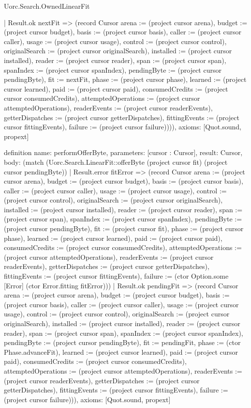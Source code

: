 \begin{lexlean}{Uorc.Search.OwnedLinearFit}
\begin{semanticmodule}
{    | Result.ok nextFit => (record Cursor {arena := (project cursor arena), budget := (project cursor budget), basis := (project cursor basis), caller := (project cursor caller), usage := (project cursor usage), control := (project cursor control), originalSearch := (project cursor originalSearch), installed := (project cursor installed), reader := (project cursor reader), span := (project cursor span), spanIndex := (project cursor spanIndex), pendingByte := (project cursor pendingByte), fit := nextFit, phase := (project cursor phase), learned := (project cursor learned), paid := (project cursor paid), consumedCredits := (project cursor consumedCredits), attemptedOperations := (project cursor attemptedOperations), readerEvents := (project cursor readerEvents), getterDispatches := (project cursor getterDispatches), fittingEvents := (project cursor fittingEvents), failure := (project cursor failure)}))),
  axioms: [Quot.sound, propext]
}

definition{
  name: performOfferByte,
  parameters: [cursor : Cursor],
  result: Cursor,
  body: (match (Uorc.Search.LinearFit::offerByte (project cursor fit) (project cursor pendingByte))
    | Result.error fitError => (record Cursor {arena := (project cursor arena), budget := (project cursor budget), basis := (project cursor basis), caller := (project cursor caller), usage := (project cursor usage), control := (project cursor control), originalSearch := (project cursor originalSearch), installed := (project cursor installed), reader := (project cursor reader), span := (project cursor span), spanIndex := (project cursor spanIndex), pendingByte := (project cursor pendingByte), fit := (project cursor fit), phase := (project cursor phase), learned := (project cursor learned), paid := (project cursor paid), consumedCredits := (project cursor consumedCredits), attemptedOperations := (project cursor attemptedOperations), readerEvents := (project cursor readerEvents), getterDispatches := (project cursor getterDispatches), fittingEvents := (project cursor fittingEvents), failure := (ctor Option.some [Error] (ctor Error.fitting fitError))})
    | Result.ok pendingFit => (record Cursor {arena := (project cursor arena), budget := (project cursor budget), basis := (project cursor basis), caller := (project cursor caller), usage := (project cursor usage), control := (project cursor control), originalSearch := (project cursor originalSearch), installed := (project cursor installed), reader := (project cursor reader), span := (project cursor span), spanIndex := (project cursor spanIndex), pendingByte := (project cursor pendingByte), fit := pendingFit, phase := (ctor Phase.advanceFit), learned := (project cursor learned), paid := (project cursor paid), consumedCredits := (project cursor consumedCredits), attemptedOperations := (project cursor attemptedOperations), readerEvents := (project cursor readerEvents), getterDispatches := (project cursor getterDispatches), fittingEvents := (project cursor fittingEvents), failure := (project cursor failure)})),
  axioms: [Quot.sound, propext]
}


\end{semanticmodule}
\end{lexlean}

